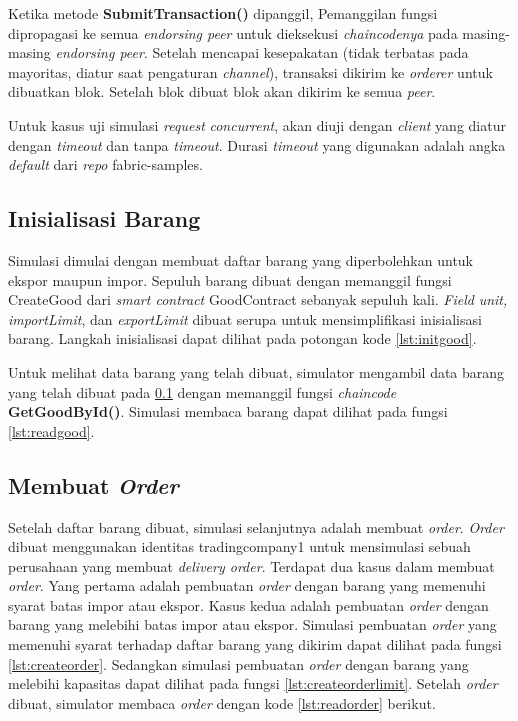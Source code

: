 Ketika metode \textbf{SubmitTransaction()} dipanggil, Pemanggilan fungsi dipropagasi ke semua \textit{endorsing peer} untuk dieksekusi \textit{chaincodenya} pada masing-masing \textit{endorsing peer}. Setelah mencapai kesepakatan (tidak terbatas pada mayoritas, diatur saat pengaturan \textit{channel}), transaksi dikirim ke \textit{orderer} untuk dibuatkan blok. Setelah blok dibuat blok akan dikirim ke semua \textit{peer}.

Untuk kasus uji simulasi \textit{request} \textit{concurrent}, akan diuji dengan \textit{client} yang diatur dengan \textit{timeout} dan tanpa \textit{timeout}. Durasi \textit{timeout} yang digunakan adalah angka \textit{default} dari \textit{repo} fabric-samples.

\subsection{Inisialisasi Barang}
\label{subsec:init-good}
Simulasi dimulai dengan membuat daftar barang yang diperbolehkan untuk ekspor maupun impor. Sepuluh barang dibuat dengan memanggil fungsi CreateGood dari \textit{smart contract} GoodContract sebanyak sepuluh kali. \textit{Field} \textit{unit, importLimit}, dan \textit{exportLimit} dibuat serupa untuk mensimplifikasi inisialisasi barang. Langkah inisialisasi dapat dilihat pada potongan kode \ref{lst:initgood}.



Untuk melihat data barang yang telah dibuat, simulator mengambil data barang yang telah dibuat pada \ref{subsec:init-good} dengan memanggil fungsi \textit{chaincode} \textbf{GetGoodById()}. Simulasi membaca barang dapat dilihat pada fungsi \ref{lst:readgood}.



\subsection{Membuat \textit{Order}}
Setelah daftar barang dibuat, simulasi selanjutnya adalah membuat \textit{order}. \textit{Order} dibuat menggunakan identitas tradingcompany1 untuk mensimulasi sebuah perusahaan yang membuat \textit{delivery order}. Terdapat dua kasus dalam membuat \textit{order}. Yang pertama adalah pembuatan \textit{order} dengan barang yang memenuhi syarat batas impor atau ekspor. Kasus kedua adalah pembuatan \textit{order} dengan barang yang melebihi batas impor atau ekspor. Simulasi pembuatan \textit{order} yang memenuhi syarat terhadap daftar barang yang dikirim dapat dilihat pada fungsi \ref{lst:createorder}. Sedangkan simulasi pembuatan \textit{order} dengan barang yang melebihi kapasitas dapat dilihat pada fungsi \ref{lst:createorderlimit}. Setelah \textit{order} dibuat, simulator membaca \textit{order} dengan kode \ref{lst:readorder} berikut.

